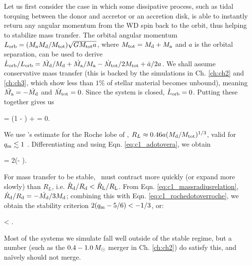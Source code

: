Let us first consider the case in which some dissipative process, such as tidal torquing between the donor and accretor or an accretion disk, is able to instantly return any angular momentum from the WD spin back to the orbit, thus helping to stabilize mass transfer.  The orbital angular momentum $L_\mrm{orb} = (\Ma\Md/\Mtot)\sqrt{G\Mtot a}$, where $\Mtot = \Md + \Ma$ and $a$ is the orbital separation, can be used to derive $\dot{L}_\mrm{orb}/L_\mrm{orb} = \dot{\Md}/\Md + \dot{\Ma}/\Ma - \dot{M}_\mrm{tot}/2\Mtot + \dot{a}/2a$.  We shall assume conservative mass transfer (this is backed by the simulations in Ch. \ref{ch:ch2} and \ref{ch:ch3}, which show less than $1$\% of stellar material becomes unbound), meaning $\dot{\Ma} = -\dot{\Md}$ and $\dot{M}_\mathrm{tot} = 0$.  Since the system is closed, $\dot{L}_\mathrm{orb} = 0$.  Putting these together gives us

\eqbegin
{} = (1 - \qm)\frac{\dot{\Md}}{\Md} +  = 0.
\label{eq:c1_adotovera}
\eqend

\noindent We use \cite{pacz71}'s estimate for the Roche lobe of \Md, $R_L \approx 0.46a(\Md/\Mtot)^{1/3}$, valid for $\qm \lesssim 1$ \citep{eggl83}.  Differentiating and using Eqn. \ref{eq:c1_adotovera}, we obtain

\eqbegin
{} = 2(\qm- )\frac{\dot{\Md}}{\Md}.
\label{eq:c1_rochedotoverroche}
\eqend

\noindent For mass transfer to be stable, \Rd\ must contract more quickly (or expand more slowly) than $R_L$, i.e. $\dot{R}_\mrm{d}/\Rd < \dot{R}_\mrm{L}/R_\mrm{L}$.  From Eqn. \ref{eq:c1_massradiusrelation}, $\dot{R}_\mrm{d}/\Rd = -\dot{\Md}/3\Md$; combining this with Eqn. \ref{eq:c1_rochedotoverroche}, we obtain the stability criterion $2(\qm- 5/6) < -1/3$, or:

\eqbegin
\qm < .
\label{eq:c1_qcrit}
\eqend

\noindent Most of the systems we simulate fall well outside of the stable regime, but a number (such as the $0.4 - 1.0\,\Msun$ merger in Ch. \ref{ch:ch2}) do satisfy this, and na\"{i}vely should not merge.

